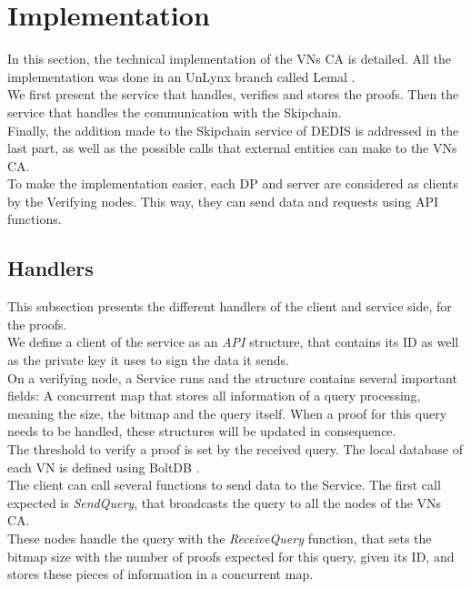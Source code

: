 \documentclass{article}
\begin{document}
\section{Implementation}
In this section, the technical implementation of the VNs CA is detailed. All the implementation was done in an UnLynx branch called Lemal \cite{lemal}.\\
We first present the service that handles, verifies and stores the proofs. Then the service that handles the communication with the Skipchain.\\
Finally, the addition made to the Skipchain service of DEDIS \cite{skipchain} is addressed in the last part, as well as the possible calls that external entities can make to the VNs CA.\\

To make the implementation easier, each DP and server are considered as clients by the Verifying nodes. This way, they can send data and requests using API functions.\\

\subsection{Handlers}
This subsection presents the different handlers of the client and service side, for the proofs.\\

We define a client of the service as an \textit{API} structure, that contains its ID as well as the private key it uses to sign the data it sends.\\
On a verifying node, a Service runs and the structure contains several important fields: A concurrent map that stores all information of a query processing, meaning the size, the bitmap and the query itself. When a proof for this query needs to be handled, these structures will be updated in consequence.\\
The threshold to verify a proof is set by the received query. The local database of each VN is defined using BoltDB \cite{bolt}.\\

The client can call several functions to send data to the Service. The first call expected is \textit{SendQuery}, that broadcasts the query to all the nodes of the VNs CA.\\
These nodes handle the query with the \textit{ReceiveQuery} function, that sets the bitmap size with the number of proofs expected for this query, given its ID, and stores these pieces of information in a concurrent map.\\
\end{document}
